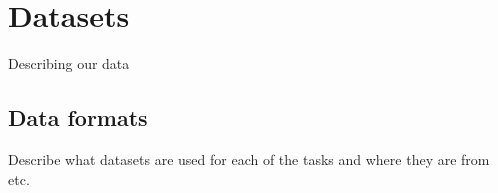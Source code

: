 
\chapter{Datasets}
Describing our data
\section{Data formats}
Describe what datasets are used for each of the tasks and where they are from etc.